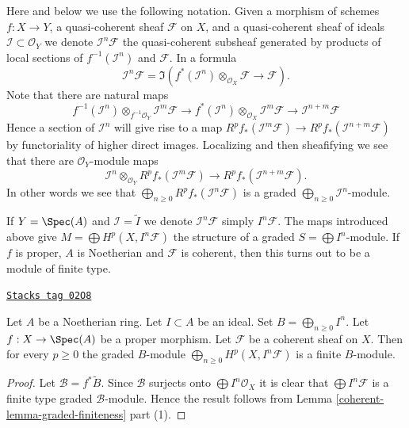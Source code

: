 \medskip\noindent
Here and below we use the following notation.
Given a morphism of schemes $f : X \to Y$, a quasi-coherent sheaf
$\mathcal{F}$ on $X$, and a quasi-coherent sheaf of ideals
$\mathcal{I} \subset \mathcal{O}_Y$ we denote
$\mathcal{I}^n\mathcal{F}$ the quasi-coherent subsheaf generated
by products of local sections of $f^{-1}(\mathcal{I}^n)$ and
$\mathcal{F}$. In a formula
$$
\mathcal{I}^n\mathcal{F}
=
\Im\left(
f^*(\mathcal{I}^n) \otimes_{\mathcal{O}_X} \mathcal{F}
\longrightarrow
\mathcal{F}
\right).
$$
Note that there are natural maps
$$
f^{-1}(\mathcal{I}^n) \otimes_{f^{-1}\mathcal{O}_Y} \mathcal{I}^m\mathcal{F}
\longrightarrow
f^*(\mathcal{I}^n) \otimes_{\mathcal{O}_X} \mathcal{I}^m\mathcal{F}
\longrightarrow
\mathcal{I}^{n + m}\mathcal{F}
$$
Hence a section of $\mathcal{I}^n$ will give rise to a
map $R^pf_*(\mathcal{I}^m\mathcal{F}) \to
R^pf_*(\mathcal{I}^{n + m}\mathcal{F})$ by functoriality
of higher direct images. Localizing and then sheafifying we
see that there are $\mathcal{O}_Y$-module maps
$$
\mathcal{I}^n \otimes_{\mathcal{O}_Y} R^pf_*(\mathcal{I}^m\mathcal{F})
\longrightarrow
R^pf_*(\mathcal{I}^{n + m}\mathcal{F}).
$$
In other words we see that
$\bigoplus_{n \geq 0} R^pf_*(\mathcal{I}^n\mathcal{F})$
is a graded $\bigoplus_{n \geq 0} \mathcal{I}^n$-module.

\medskip\noindent
If $Y = \Spec(A)$ and $\mathcal{I} = \widetilde{I}$ we denote
$\mathcal{I}^n\mathcal{F}$ simply $I^n\mathcal{F}$. The maps
introduced above give $M = \bigoplus H^p(X, I^n\mathcal{F})$ the
structure of a graded $S = \bigoplus I^n$-module. If $f$ is proper,
$A$ is Noetherian and $\mathcal{F}$ is coherent, then this turns out
to be a module of finite type.

\begin{lemma}
\label{coherent-lemma-cohomology-powers-ideal-times-F}
\href{https://stacks.math.columbia.edu/tag/02O8}{\texttt{Stacks tag 02O8}}

\begin{reference}
\cite[III Cor 3.3.2]{EGA}
\end{reference}
Let $A$ be a Noetherian ring.
Let $I \subset A$ be an ideal.
Set $B = \bigoplus_{n \geq 0} I^n$.
Let $f : X \to \Spec(A)$ be a proper morphism.
Let $\mathcal{F}$ be a coherent sheaf on $X$.
Then for every $p \geq 0$ the graded $B$-module
$\bigoplus_{n \geq 0} H^p(X, I^n\mathcal{F})$ is
a finite $B$-module.
\end{lemma}

\begin{proof}

Let $\mathcal{B} = f^*\widetilde{B}$. Since $\mathcal{B}$ surjects
onto $\bigoplus I^n\mathcal{O}_X$ it is clear that
$\bigoplus I^n\mathcal{F}$ is a finite type graded $\mathcal{B}$-module.
Hence the result follows from Lemma \ref{coherent-lemma-graded-finiteness} part (1).
\end{proof}

